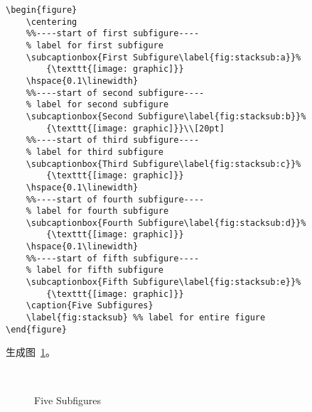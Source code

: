 \begin{lstlisting}
\begin{figure}
	\centering
	%%----start of first subfigure----
	% label for first subfigure
	\subcaptionbox{First Subfigure\label{fig:stacksub:a}}%
		{\texttt{[image: graphic]}}
	\hspace{0.1\linewidth}
	%%----start of second subfigure----
	% label for second subfigure
	\subcaptionbox{Second Subfigure\label{fig:stacksub:b}}%
		{\texttt{[image: graphic]}}\\[20pt]
	%%----start of third subfigure----
	% label for third subfigure
	\subcaptionbox{Third Subfigure\label{fig:stacksub:c}}%
		{\texttt{[image: graphic]}}
	\hspace{0.1\linewidth}
	%%----start of fourth subfigure----
	% label for fourth subfigure
	\subcaptionbox{Fourth Subfigure\label{fig:stacksub:d}}%
		{\texttt{[image: graphic]}}
	\hspace{0.1\linewidth}
	%%----start of fifth subfigure----
	% label for fifth subfigure
	\subcaptionbox{Fifth Subfigure\label{fig:stacksub:e}}%
		{\texttt{[image: graphic]}}
	\caption{Five Subfigures}
	\label{fig:stacksub} %% label for entire figure
\end{figure}
\end{lstlisting}
生成图~\ref{fig:stacksub}。

\begin{figure}
	\centering
		{\resizebox{0.25\linewidth}{!}{\usebox{\boxgraphic}}}
	\hspace{0.1\linewidth}
		{\resizebox{0.25\linewidth}{!}{\usebox{\boxgraphic}}}\\[20pt]
		{\resizebox{0.25\linewidth}{!}{\usebox{\boxgraphic}}}
	\hspace{0.1\linewidth}
		{\resizebox{0.25\linewidth}{!}{\usebox{\boxgraphic}}}
	\hspace{0.1\linewidth}
		{\resizebox{0.25\linewidth}{!}{\usebox{\boxgraphic}}}
	\caption{Five Subfigures}
	\label{fig:stacksub} %
\end{figure}

